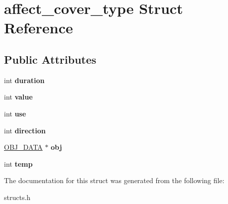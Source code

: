 \hypertarget{structaffect__cover__type}{\section{affect\-\_\-cover\-\_\-type Struct Reference}
\label{structaffect__cover__type}
}
\subsection*{Public Attributes}
\begin{DoxyCompactItemize}
\item 
\hypertarget{structaffect__cover__type_aa94d0914f5a09c6e08771751723a885e}{int {\bfseries duration}}\label{structaffect__cover__type_aa94d0914f5a09c6e08771751723a885e}

\item 
\hypertarget{structaffect__cover__type_a94ce13ff419fda541dd1735b746d5c88}{int {\bfseries value}}\label{structaffect__cover__type_a94ce13ff419fda541dd1735b746d5c88}

\item 
\hypertarget{structaffect__cover__type_aacd2e9cac687efcfece092cfb42577a2}{int {\bfseries use}}\label{structaffect__cover__type_aacd2e9cac687efcfece092cfb42577a2}

\item 
\hypertarget{structaffect__cover__type_a05a8e09728ca7c19c047b3a05cdafd26}{int {\bfseries direction}}\label{structaffect__cover__type_a05a8e09728ca7c19c047b3a05cdafd26}

\item 
\hypertarget{structaffect__cover__type_ac87ca859fc436a25a97ad7c8356ae7f3}{\hyperlink{structobj__data}{O\-B\-J\-\_\-\-D\-A\-T\-A} $\ast$ {\bfseries obj}}\label{structaffect__cover__type_ac87ca859fc436a25a97ad7c8356ae7f3}

\item 
\hypertarget{structaffect__cover__type_aaa1b0b9d8101ccbcb84c21f7334d15b9}{int {\bfseries temp}}\label{structaffect__cover__type_aaa1b0b9d8101ccbcb84c21f7334d15b9}

\end{DoxyCompactItemize}


The documentation for this struct was generated from the following file\-:\begin{DoxyCompactItemize}
\item 
structs.\-h\end{DoxyCompactItemize}
